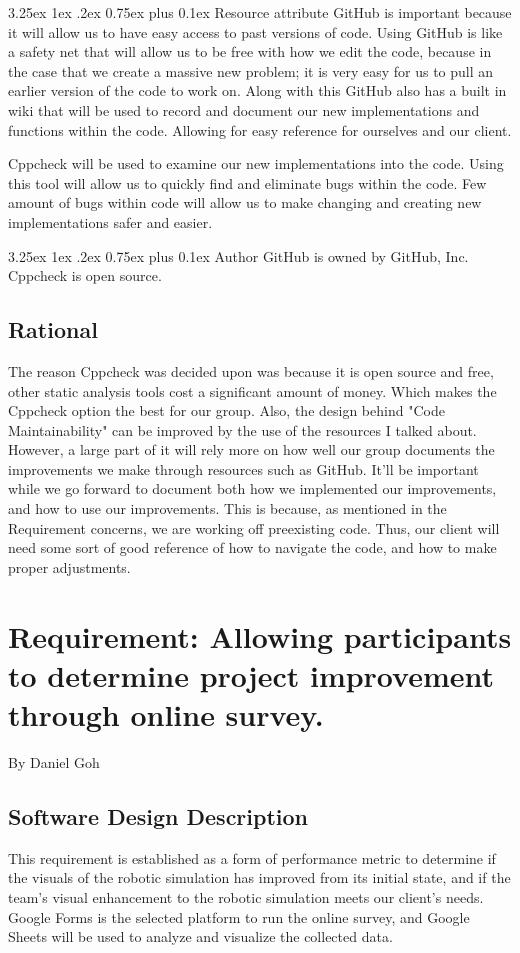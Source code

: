 \documentclass[10pt,journal,compsoc,draftclsnofoot]{IEEEtran}
\makeatletter
\newcommand\subparagraph{%
  \@startsection{subparagraph}{5}
  {\parindent}
  {3.25ex \@plus 1ex \@minus .2ex}
  {0.75ex plus 0.1ex}
  {\normalfont\normalsize\bfseries}}
\makeatother
\begin{document}
\begin{flushleft}
\subparagraph{Resource attribute}
GitHub is important because it will allow us to have easy access to past versions of code.
Using GitHub is like a safety net that will allow us to be free with how we edit the code, because in the case that we create a massive new problem;
it is very easy for us to pull an earlier version of the code to work on.
Along with this GitHub also has a built in wiki that will be used to record and document our new implementations and functions within the code.
Allowing for easy reference for ourselves and our client.\par
Cppcheck will be used to examine our new implementations into the code.
Using this tool will allow us to quickly find and eliminate bugs within the code.
Few amount of bugs within code will allow us to make changing and creating new implementations safer and easier.

\subparagraph{Author}
GitHub is owned by GitHub, Inc.
Cppcheck is open source.

\subsection{Rational}
The reason Cppcheck was decided upon was because it is open source and free, other static analysis tools cost a significant amount of money.
Which makes the Cppcheck option the best for our group.
Also, the design behind "Code Maintainability" can be improved by the use of the resources I talked about. 
However, a large part of it will rely more on how well our group documents the improvements we make through resources such as GitHub.
It'll be important while we go forward to document both how we implemented our improvements, and how to use our improvements.
This is because, as mentioned in the Requirement concerns, we are working off preexisting code.
Thus, our client will need some sort of good reference of how to navigate the code, and how to make proper adjustments.


\newpage
\section{Requirement: Allowing participants to determine project improvement through online survey.}
\large{By Daniel Goh}

\normalsize
\subsection{Software Design Description}
This requirement is established as a form of performance metric to determine if the visuals of the robotic simulation has improved from its initial state, and if the team's visual enhancement to the robotic simulation meets our client's needs. 
Google Forms is the selected platform to run the online survey, and Google Sheets will be used to analyze and visualize the collected data.


\end{flushleft}
\end{document}

